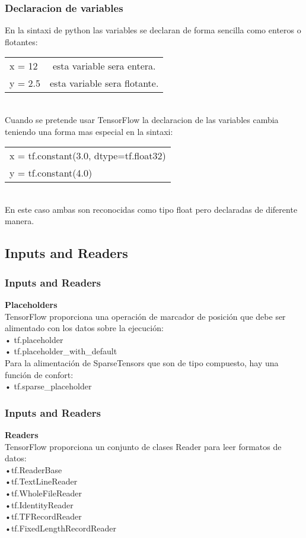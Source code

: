 \documentclass{beamer}
\begin{document}
\newpage
\begin{frame}\frametitle{Declaracion de variables}
En la sintaxi de python las variables se declaran de forma sencilla
como enteros o flotantes:\\
\vspace{5mm}
\begin{tabular}{l c}
x = 12 & esta variable sera entera.\\
y = 2.5 & esta variable sera flotante.\\
\end{tabular}\\
\vspace{5mm}
Cuando se pretende usar TensorFlow la declaracion de las variables
cambia teniendo una forma mas especial en la sintaxi:\\
\vspace{5mm}
\begin{tabular}{l}
x = tf.constant(3.0, dtype=tf.float32)\\
y = tf.constant(4.0)\\
\end{tabular}\\
\vspace{5mm}
En este caso ambas son reconocidas como tipo float pero
declaradas de diferente manera.
\end{frame}

\newpage
\subsection{Inputs and Readers}
\begin{frame}\frametitle{Inputs and Readers}
\textbf{Placeholders}\\
TensorFlow proporciona una operación de marcador de posición
que debe ser alimentado con los datos sobre la ejecución:\\
\vspace{5mm}
• tf.placeholder\\
• tf.placeholder\_with\_default\\
\vspace{5mm}
Para la alimentación de SparseTensors que son de tipo compuesto,
hay una función de confort:\\
\vspace{5mm}
• tf.sparse\_placeholder
\end{frame}

\newpage
\begin{frame}\frametitle{Inputs and Readers}
\textbf{Readers}\\
TensorFlow proporciona un conjunto de clases Reader para leer
formatos de datos:\\
\vspace{5mm}
•tf.ReaderBase\\
•tf.TextLineReader\\
•tf.WholeFileReader\\
•tf.IdentityReader\\
•tf.TFRecordReader\\
•tf.FixedLengthRecordReader\\
\end{frame}
\end{document}
